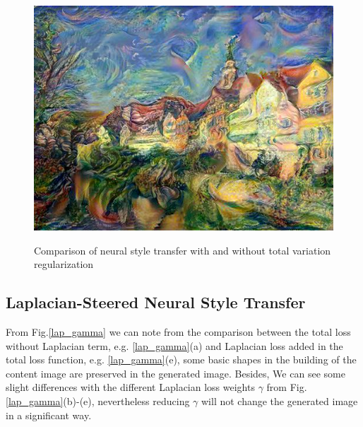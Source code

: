 \documentclass[runningheads]{llncs}
\begin{document}
\begin{figure}[h!]
{\begin{minipage}[b]{0.4\textwidth}
\includegraphics[width=1\textwidth]{neural_style_transfer/img/TV_laplacian/original_output_tv.jpg} \\
\end{minipage}
}
\caption{Comparison of neural style transfer with and without total variation regularization}
\label{TV and lap}
\end{figure}

\subsection{Laplacian-Steered Neural Style Transfer}

From Fig.\ref{lap_gamma} we can note from the comparison between the total loss without Laplacian term, e.g. \ref{lap_gamma}(a) and Laplacian loss added in the total loss function, e.g. \ref{lap_gamma}(e), some basic shapes in the building of the content image are preserved in the generated image. Besides, We can see some slight differences  with the different Laplacian loss weights $\gamma$ from Fig.\ref{lap_gamma}(b)-(e), nevertheless reducing $\gamma$ will not change the generated image in a significant way\cite{LiChuan2016CMRF}.
\end{document}
